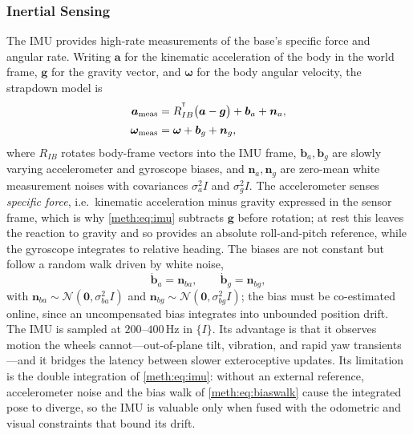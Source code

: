 \subsubsection{Inertial Sensing}

The IMU provides high-rate measurements of the base's specific force and angular rate. Writing $\bm{a}$ for the kinematic acceleration of the body in the world frame, $\bm{g}$ for the gravity vector, and $\bm{\omega}$ for the body angular velocity, the strapdown model is
\begin{equation}
\begin{aligned}
\bm{a}_{\mathrm{meas}} &= R_{IB}^{^{\mathsf{T}}}\big(\bm{a}-\bm{g}\big) + \bm{b}_{a} + \bm{n}_{a},\\[2pt]
\bm{\omega}_{\mathrm{meas}} &= \bm{\omega} + \bm{b}_{g} + \bm{n}_{g},
\end{aligned}
\label{meth:eq:imu}
\end{equation}
where $R_{IB}$ rotates body-frame vectors into the IMU frame, $\bm{b}_{a},\bm{b}_{g}$ are slowly varying accelerometer and gyroscope biases, and $\bm{n}_{a},\bm{n}_{g}$ are zero-mean white measurement noises with covariances $\sigma_{a}^{2}I$ and $\sigma_{g}^{2}I$. The accelerometer senses \emph{specific force}, i.e.\ kinematic acceleration minus gravity expressed in the sensor frame, which is why \eqref{meth:eq:imu} subtracts $\bm{g}$ before rotation; at rest this leaves the reaction to gravity and so provides an absolute roll-and-pitch reference, while the gyroscope integrates to relative heading. The biases are not constant but follow a random walk driven by white noise,
\begin{equation}
\dot{\bm{b}}_{a} = \bm{n}_{ba},\qquad
\dot{\bm{b}}_{g} = \bm{n}_{bg},
\label{meth:eq:biaswalk}
\end{equation}
with $\bm{n}_{ba}\sim\mathcal{N}(\mathbf{0},\sigma_{ba}^{2}I)$ and $\bm{n}_{bg}\sim\mathcal{N}(\mathbf{0},\sigma_{bg}^{2}I)$; the bias must be co-estimated online, since an uncompensated bias integrates into unbounded position drift. The IMU is sampled at \ensuremath{200\text{--}400\,\mathrm{Hz}} in $\{I\}$. Its advantage is that it observes motion the wheels cannot---out-of-plane tilt, vibration, and rapid yaw transients---and it bridges the latency between slower exteroceptive updates. Its limitation is the double integration of \eqref{meth:eq:imu}: without an external reference, accelerometer noise and the bias walk of \eqref{meth:eq:biaswalk} cause the integrated pose to diverge, so the IMU is valuable only when fused with the odometric and visual constraints that bound its drift.

